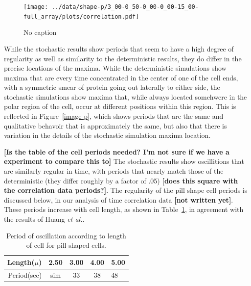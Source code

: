 \documentclass[letterpaper,twocolumn,amsmath,amssymb,pre]{revtex4-1}
\newcommand{\red}[1]{{\bf \color{red} #1}}
\newcommand{\fixme}[1]{\red{[#1]}}
\begin{document}
\begin{figure}
  \texttt{[image: ../data/shape-p/3\_00-0\_50-0\_00-0\_00-15\_00-full\_array/plots/correlation.pdf]}
  \caption{No caption}
  \label{corr-pill}
\end{figure}

While the stochastic results show periods that seem to have a high
degree of regularity as well as similarity to the deterministic
results, they do differ in the precise locations of the maxima.  While
the deterministic simulations show maxima that are every time
concentrated in the center of one of the cell ends, with a symmetric
smear of protein going out laterally to either side, the stochastic
simulations show maxima that, while always located somehwere in the
polar region of the cell, occur at different positions within this
region.  This is reflected in Figure~\ref{image-p}, which shows
periods that are the same and qualitative behavoir that is
approximately the same, but also that there is variation in the
details of the stochastic simulation maxima location.


\fixme{Is the table of the cell periods needed? I'm not sure if we
  have a experiment to compare this to} The stochastic results show
oscillitions that are similarly regular in time, with periods that
nearly match those of the deterministic (they differ roughly by a
factor of .05) \fixme{does this square with the correlation data
  periods?}. The regularity of the pill shape cell periods is
discussed below, in our analysis of time correlation data \fixme{not
  written yet}.  These periods increase with cell length, as shown in
Table~\ref{tab:pill-periods}, in agreement with the results of Huang
\emph{et al.}.


\begin{table}
  \begin{tabular}{|r|c|c|c|l|}
    \hline Length($\mu$) & 2.50 & 3.00 & 4.00 & 5.00\\ \hline
    Period(sec) & sim & 33 & 38 & 48 \\ \cline{2-2} \hline
  \end{tabular}
  \caption{Period of oscillation according to length of cell for
    pill-shaped cells.}\label{tab:pill-periods}
\end{table}
\end{document}
